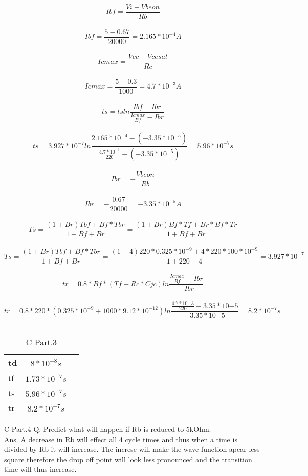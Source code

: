 \documentclass{article}
\begin{document}
$$Ibf=\frac{Vi-Vbeon}{Rb}$$\\

$$Ibf=\frac{5-0.67}{20000}=2.165*10^{-4}A$$\\

$$Ic max=\frac{Vcc-Vce sat}{Rc}$$\\

$$Ic max=\frac{5-0.3}{1000}=4.7*10^{-3}A$$\\

$$ts=ts ln\frac{Ibf-Ibr}{\frac{Icmax}{Bf} -Ibr}$$\\

$$ts=3.927*10^{-7} ln\frac{2.165*10^{-4}-(-3.35*10^{-5})}{\frac{4.7*10^{-3}}{220} -(-3.35*10^{-5})}=5.96*10^{-7}s$$\\

$$Ibr=- \frac{Vbeon}{Rb}$$\\

$$Ibr=- \frac{0.67}{20000} = -3.35*10^{-5}A$$\\


$$Ts=\frac{(1+Br)Tbf+Bf*Tbr}{1+Bf+Br}=\frac{(1+Br)Bf*Tf+Br*Bf*Tr}{1+Bf+Br}$$ \\

$$Ts=\frac{(1+Br)Tbf+Bf*Tbr}{1+Bf+Br}=\frac{(1+4)220*0.325*10^{-9}+4*220*100*10^{-9}}{1+220+4}=3.927*10^{-7}$$ \\

$$tr=0.8*Bf*(Tf+Rc*Cjc) ln\frac{\frac{Icmax}{Bf} -Ibr}{-Ibr}$$\\

$$tr=0.8*220*(0.325*10^{-9}+1000*9.12*10^{-12}) ln\frac{\frac{4.7*10{-3}}{220} -3.35*10{-5}}{-3.35*10{-5}}=8.2*10^{-7}s $$\\


\begin{table}[H]
	\centering
	\label{tab:seventhTable}
	\caption[C Part.3 Table]{C Part.3}
	\begin{tabular}{lcr}
		td&$8*10^{-8}s$ \\ \hline
		tf&$1.73*10^{-7}s$\\ \hline
		ts&$5.96*10^{-7}s$\\ \hline
		tr&$8.2*10^{-7}s$\\ \hline
	\end{tabular}
\end{table}

C Part.4
Q. Predict what will happen if Rb is reduced to 5kOhm.\\
Ans. A decrease in Rb will effect all 4 cycle times and thus when a time is divided by Rb it will increase. The increse will make the wave function apear less square therefore the drop off point will look less pronounced and the transition time will thus increase.
\end{document}
